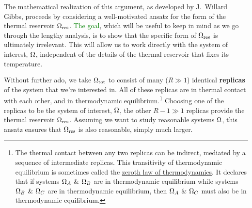 The mathematical realization of this argument, as developed by J.\ Willard Gibbs, proceeds by considering a well-motivated ansatz for the form of the thermal reservoir $\Omega_{\text{res}}$.
\textcolor{green}{The goal}, which will be useful to keep in mind as we go through the lengthy analysis, is to show that the specific form of $\Omega_{\text{res}}$ is ultimately irrelevant.
This will allow us to work directly with the system of interest, $\Omega$, independent of the details of the thermal reservoir that fixes its temperature.

Without further ado, we take $\Omega_{\text{tot}}$ to consist of many ($R \gg 1$) identical \textbf{replicas} of the system \Om that we're interested in.
All of these replicas are in thermal contact with each other, and in thermodynamic equilibrium.\footnote{The thermal contact between any two replicas can be indirect, mediated by a sequence of intermediate replicas.  This transitivity of thermodynamic equilibrium is sometimes called the \href{https://en.wikipedia.org/wiki/Zeroth_law_of_thermodynamics}{zeroth law of thermodynamics}.  It declares that if systems $\Omega_A$ \& $\Omega_B$ are in thermodynamic equilibrium while systems $\Omega_B$ \& $\Omega_C$ are in thermodynamic equilibrium, then $\Omega_A$ \& $\Omega_C$ must also be in thermodynamic equilibrium.}
Choosing one of the replicas to be the system of interest, $\Omega$, the other $R - 1 \gg 1$ replicas provide the thermal reservoir $\Omega_{\text{res}}$.
Assuming we want to study reasonable systems $\Omega$, this ansatz ensures that $\Omega_{\text{res}}$ is also reasonable, simply much larger.

